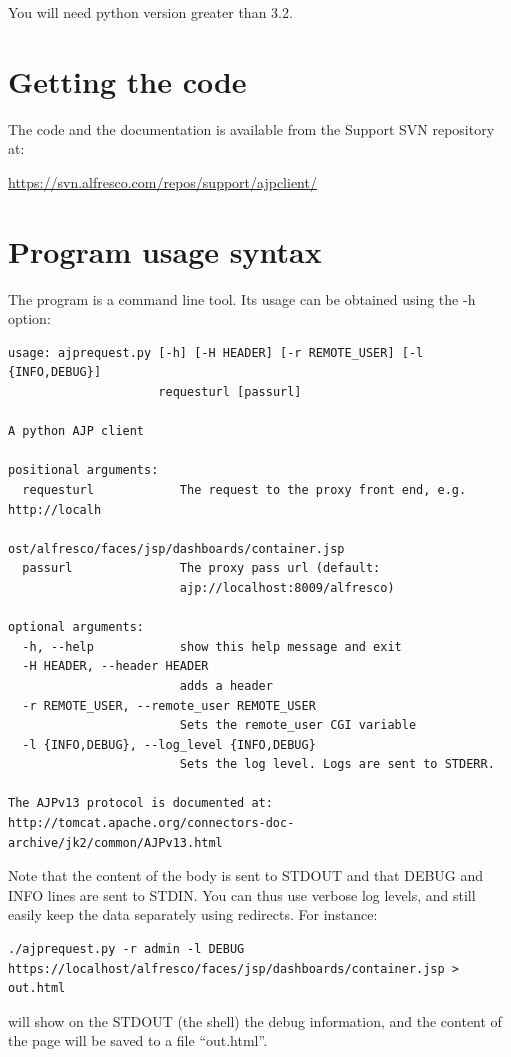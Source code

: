 \documentclass[12pt,a4]{article}
\begin{document}
You will need python version greater than 3.2.

\section{Getting the code}
The code and the documentation is available from the Support SVN repository\cite{svn} at:

\url{https://svn.alfresco.com/repos/support/ajpclient/}


\section{Program usage syntax}
The program is a command line tool. Its usage can be obtained using the -h option:

\begin{verbatim}
usage: ajprequest.py [-h] [-H HEADER] [-r REMOTE_USER] [-l {INFO,DEBUG}]
                     requesturl [passurl]

A python AJP client

positional arguments:
  requesturl            The request to the proxy front end, e.g. http://localh
                        ost/alfresco/faces/jsp/dashboards/container.jsp
  passurl               The proxy pass url (default:
                        ajp://localhost:8009/alfresco)

optional arguments:
  -h, --help            show this help message and exit
  -H HEADER, --header HEADER
                        adds a header
  -r REMOTE_USER, --remote_user REMOTE_USER
                        Sets the remote_user CGI variable
  -l {INFO,DEBUG}, --log_level {INFO,DEBUG}
                        Sets the log level. Logs are sent to STDERR.

The AJPv13 protocol is documented at: http://tomcat.apache.org/connectors-doc-
archive/jk2/common/AJPv13.html
\end{verbatim}

Note that the content of the body is sent to STDOUT and that DEBUG and INFO lines are sent to STDIN.
You can thus use verbose log levels, and still easily keep the data separately using redirects. For instance:

\begin{verbatim}
./ajprequest.py -r admin -l DEBUG https://localhost/alfresco/faces/jsp/dashboards/container.jsp > out.html
\end{verbatim}
will show on the STDOUT (the shell) the debug information, and the content of the page will be saved to a file ``out.html''.
\end{document}
